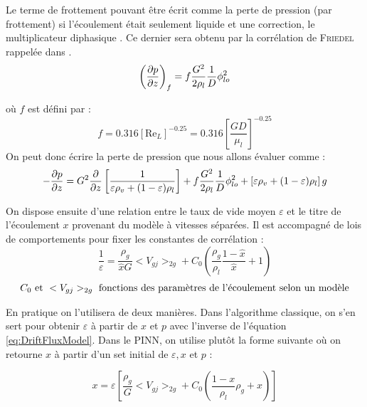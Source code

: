 Le terme de frottement pouvant être écrit comme la perte de pression (par frottement) si l'écoulement était seulement liquide et une correction, le \og multiplicateur diphasique \fg{}. Ce dernier sera obtenu par la corrélation de \textsc{Friedel} rappelée dans \cite{revellinAdiabaticTwophaseFrictional2007}.
\begin{equation}
    \left(\pder[p]{z} \right)_{f} = f\frac{G^2}{2 \rho_l}\frac{1}{D} \phi_{lo}^2
\end{equation}

où $f$ est défini par :
\begin{equation}
    f = 0.316 \left[\text{Re}_L\right]^{-0.25} = 0.316 \left[\frac{G D}{\mu_l}\right]^{-0.25} 
\end{equation}
On peut donc écrire la perte de pression que nous allons évaluer comme :
\begin{equation}
     -\pder[p]{z} = G^2\pder{z}\left[\frac{1}{\varepsilon \rho_v + (1-\varepsilon)\rho_l } \right] + f\frac{G^2}{2 \rho_l}\frac{1}{D} \phi_{lo}^2 + \left[ \varepsilon \rho_v + (1-\varepsilon)\rho_l  \right] g
\end{equation}


On dispose ensuite d'une relation entre le taux de vide moyen $\varepsilon$ et le titre de l'écoulement $x$ provenant du modèle à vitesses séparées. Il est accompagné de lois de comportements pour fixer les constantes de corrélation :
\begin{equation}
        \frac{1}{\varepsilon} = \frac{\rho_g}{\hat{x} G} <V_{gj}>_{2g} + C_0\left(\frac{\rho_g}{\rho_l}\frac{1-\hat{x}}{\hat{x}} + 1\right) 
\label{eq:DriftFluxModel}
\end{equation}
\begin{align*}
         C_0 \text{ et } <V_{gj}>_{2g} \textnormal{ fonctions des paramètres de l'écoulement selon un modèle} 
\end{align*}

En pratique on l'utilisera de deux manières. Dans l'algorithme classique, on s'en sert pour obtenir $\varepsilon$ à partir de $x$ et $p$ avec l'inverse de l'équation \ref{eq:DriftFluxModel}. Dans le PINN, on utilise plutôt la forme suivante où on retourne $x$ à partir d'un set initial de $\varepsilon,x$ et $p$ :

\begin{equation}
    x = \varepsilon \left[ \frac{\rho_g}{G}<V_{gj}>_{2g} + C_0 \left( \frac{1-x}{\rho_l}\rho_g + x\right) \right]
\end{equation}

